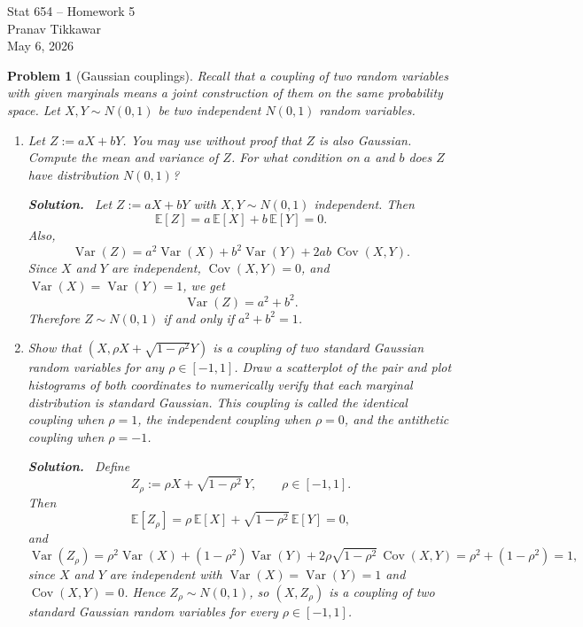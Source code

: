 \documentclass[11pt]{article}
\newtheorem{problem}{Problem}
\newenvironment{solution}{\par\noindent\textbf{Solution.}\ }{\par}
\begin{document}
\begin{center}
{\Large Stat 654 -- Homework 5}\\[4pt]
Pranav Tikkawar\\
May 6, 2026
\end{center}

\bigskip

\begin{problem}[Gaussian couplings]
Recall that a coupling of two random variables with given marginals means a joint
construction of them on the same probability space. Let $X,Y \sim N(0,1)$ be two
independent $N(0,1)$ random variables.

\begin{enumerate}
\item Let $Z := aX + bY$. You may use without proof that $Z$ is also Gaussian.
Compute the mean and variance of $Z$. For what condition on $a$ and $b$ does $Z$
have distribution $N(0,1)$?

\begin{solution}
Let $Z := aX + bY$ with $X,Y \sim N(0,1)$ independent. Then
\[
  \mathbb{E}[Z] = a\,\mathbb{E}[X] + b\,\mathbb{E}[Y] = 0.
\]
Also,
\[
  \operatorname{Var}(Z)
  = a^2\operatorname{Var}(X) + b^2\operatorname{Var}(Y)
    + 2ab\,\operatorname{Cov}(X,Y).
\]
Since $X$ and $Y$ are independent, $\operatorname{Cov}(X,Y)=0$, and
$\operatorname{Var}(X)=\operatorname{Var}(Y)=1$, we get
\[
  \operatorname{Var}(Z) = a^2 + b^2.
\]
Therefore $Z \sim N(0,1)$ if and only if $a^2 + b^2 = 1$.\qedhere
\end{solution}

\item Show that $(X, \rho X + \sqrt{1-\rho^2}Y)$ is a coupling of two standard
Gaussian random variables for any $\rho \in [-1,1]$. Draw a scatterplot of the pair
and plot histograms of both coordinates to numerically verify that each marginal
distribution is standard Gaussian. This coupling is called the identical coupling
when $\rho = 1$, the independent coupling when $\rho = 0$, and the antithetic
coupling when $\rho = -1$.

\begin{solution}
Define
\[
  Z_\rho := \rho X + \sqrt{1-\rho^2}\,Y, \qquad \rho \in [-1,1].
\]
Then
\[
  \mathbb{E}[Z_\rho]
  = \rho\,\mathbb{E}[X] + \sqrt{1-\rho^2}\,\mathbb{E}[Y]
  = 0,
\]
and
\[
  \operatorname{Var}(Z_\rho)
  = \rho^2\operatorname{Var}(X) + (1-\rho^2)\operatorname{Var}(Y)
    + 2\rho\sqrt{1-\rho^2}\,\operatorname{Cov}(X,Y)
  = \rho^2 + (1-\rho^2) = 1,
\]
since $X$ and $Y$ are independent with $\operatorname{Var}(X)=\operatorname{Var}(Y)=1$
and $\operatorname{Cov}(X,Y)=0$. Hence $Z_\rho \sim N(0,1)$, so $(X,Z_\rho)$ is a
coupling of two standard Gaussian random variables for every $\rho \in [-1,1]$.


\end{solution}
\end{enumerate}
\end{problem}
\end{document}
